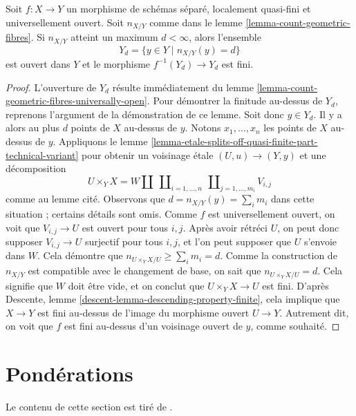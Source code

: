 \begin{lemma}
\label{lemma-large-open}
Soit $f : X \to Y$ un morphisme de schémas séparé, localement quasi-fini et universellement ouvert.
Soit $n_{X/Y}$ comme dans le
lemme \ref{lemma-count-geometric-fibres}.
Si $n_{X/Y}$ atteint un maximum $d < \infty$, alors l'ensemble
$$
Y_d = \{y \in Y \mid n_{X/Y}(y) = d\}
$$
est ouvert dans $Y$ et le morphisme $f^{-1}(Y_d) \to Y_d$ est fini.
\end{lemma}

\begin{proof}
L'ouverture de $Y_d$ résulte immédiatement du
lemme \ref{lemma-count-geometric-fibres-universally-open}.
Pour démontrer la finitude au-dessus de $Y_d$, reprenons l'argument de la
démonstration de ce lemme. Soit donc $y \in Y_d$. Il y a alors
au plus $d$ points de $X$ au-dessus de $y$. Notons
$x_1, \ldots, x_n$ les points de $X$
au-dessus de $y$. Appliquons le
lemme \ref{lemma-etale-splits-off-quasi-finite-part-technical-variant}
pour obtenir un voisinage \'etale $(U, u) \to (Y, y)$ et une décomposition
$$
U \times_Y X =
W \amalg
\ \coprod\nolimits_{i = 1, \ldots, n}
\ \coprod\nolimits_{j = 1, \ldots, m_i}
V_{i, j}
$$
comme au lemme cité. Observons que $d = n_{X/Y}(y) = \sum_i m_i$
dans cette situation ; certains détails sont omis.
Comme $f$ est universellement ouvert, on voit
que $V_{i, j} \to U$ est ouvert pour tous $i, j$. Après avoir rétréci
$U$, on peut donc supposer $V_{i, j} \to U$ surjectif
pour tous $i, j$, et l'on peut supposer que $U$ s'envoie dans $W$.
Cela démontre que $n_{U \times_Y X/U} \geq \sum_i m_i = d$.
Comme la construction de $n_{X/Y}$ est compatible avec le
changement de base, on sait que $n_{U \times_Y X/U} = d$. Cela signifie que
$W$ doit être vide, et on conclut que $U \times_Y X \to U$ est fini.
D'après Descente, lemme \ref{descent-lemma-descending-property-finite},
cela implique que $X \to Y$ est fini au-dessus de
l'image du morphisme ouvert $U \to Y$. Autrement dit,
on voit que $f$ est fini au-dessus d'un voisinage ouvert de $y$,
comme souhaité.
\end{proof}






\section{Pondérations}
\label{section-weightings}

\noindent
Le contenu de cette section est tiré de \cite[Exposé XVII, 6.2.4]{SGA4}.

